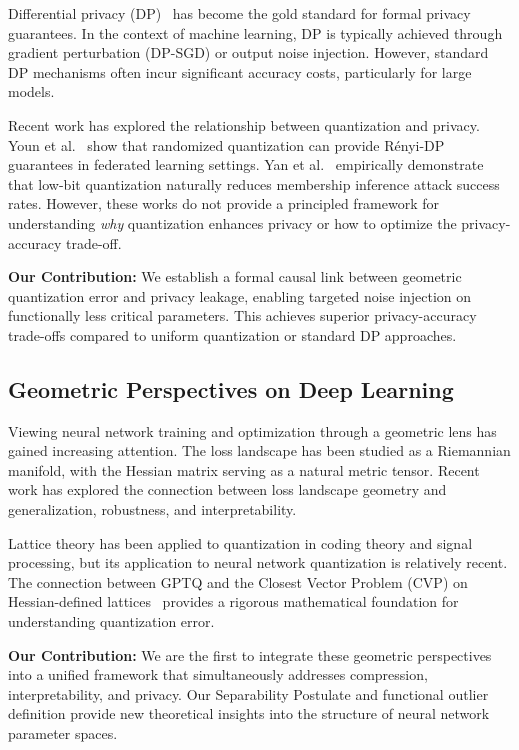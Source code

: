 \documentclass[letterpaper,twocolumn,10pt]{article}
\begin{document}
Differential privacy (DP)~\cite{dwork2014algorithmic} has become the gold standard for formal privacy guarantees. In the context of machine learning, DP is typically achieved through gradient perturbation (DP-SGD) or output noise injection. However, standard DP mechanisms often incur significant accuracy costs, particularly for large models.

Recent work has explored the relationship between quantization and privacy. Youn et al.~\cite{youn2023randomized} show that randomized quantization can provide Rényi-DP guarantees in federated learning settings. Yan et al.~\cite{yan2023privacy} empirically demonstrate that low-bit quantization naturally reduces membership inference attack success rates. However, these works do not provide a principled framework for understanding \emph{why} quantization enhances privacy or how to optimize the privacy-accuracy trade-off.

\textbf{Our Contribution:} We establish a formal causal link between geometric quantization error and privacy leakage, enabling targeted noise injection on functionally less critical parameters. This achieves superior privacy-accuracy trade-offs compared to uniform quantization or standard DP approaches.

\subsection{Geometric Perspectives on Deep Learning}

Viewing neural network training and optimization through a geometric lens has gained increasing attention. The loss landscape has been studied as a Riemannian manifold, with the Hessian matrix serving as a natural metric tensor. Recent work has explored the connection between loss landscape geometry and generalization, robustness, and interpretability.

Lattice theory has been applied to quantization in coding theory and signal processing, but its application to neural network quantization is relatively recent. The connection between GPTQ and the Closest Vector Problem (CVP) on Hessian-defined lattices~\cite{frantar2022gptq} provides a rigorous mathematical foundation for understanding quantization error.

\textbf{Our Contribution:} We are the first to integrate these geometric perspectives into a unified framework that simultaneously addresses compression, interpretability, and privacy. Our Separability Postulate and functional outlier definition provide new theoretical insights into the structure of neural network parameter spaces.
\end{document}
